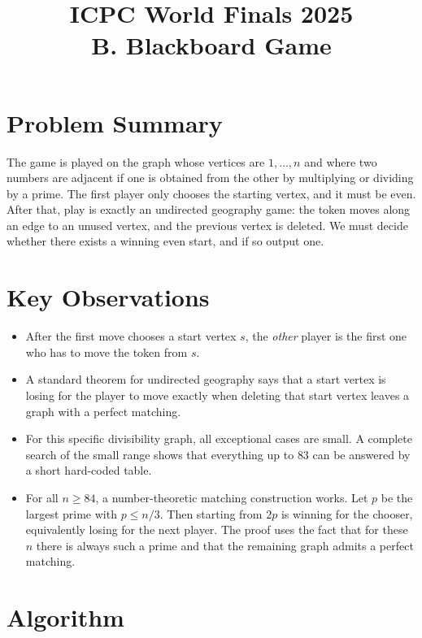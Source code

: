 \documentclass[11pt]{article}
\title{ICPC World Finals 2025\\B. Blackboard Game}
\author{}
\date{}
\begin{document}
\maketitle

\section*{Problem Summary}

The game is played on the graph whose vertices are $1,\dots,n$ and where two numbers are adjacent if
one is obtained from the other by multiplying or dividing by a prime. The first player only chooses the
starting vertex, and it must be even. After that, play is exactly an undirected geography game: the token
moves along an edge to an unused vertex, and the previous vertex is deleted. We must decide whether
there exists a winning even start, and if so output one.

\section*{Key Observations}

\begin{itemize}[leftmargin=*]
    \item After the first move chooses a start vertex $s$, the \emph{other} player is the first one who has to
    move the token from $s$.
    \item A standard theorem for undirected geography says that a start vertex is losing for the player to
    move exactly when deleting that start vertex leaves a graph with a perfect matching.
    \item For this specific divisibility graph, all exceptional cases are small. A complete search of the small
    range shows that everything up to $83$ can be answered by a short hard-coded table.
    \item For all $n \ge 84$, a number-theoretic matching construction works. Let $p$ be the largest prime
    with $p \le n/3$. Then starting from $2p$ is winning for the chooser, equivalently losing for the next
    player. The proof uses the fact that for these $n$ there is always such a prime and that the remaining
    graph admits a perfect matching.
\end{itemize}

\section*{Algorithm}
\end{document}
